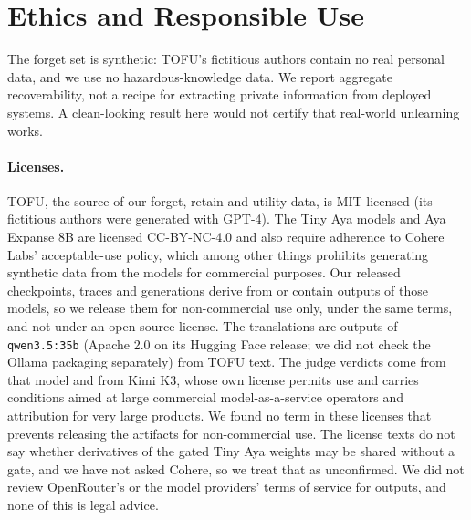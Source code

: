 \documentclass[10pt,twocolumn]{article}
\newcommand{\code}[1]{\texttt{#1}}
\begin{document}
\section{Ethics and Responsible Use}
\label{sec:ethics}
The forget set is synthetic: TOFU's fictitious authors contain no real personal data, and we use no hazardous-knowledge data. We report aggregate recoverability, not a recipe for extracting private information from deployed systems. A clean-looking result here would not certify that real-world unlearning works.

\paragraph{Licenses.} TOFU, the source of our forget, retain and utility data, is MIT-licensed (its fictitious authors were generated with GPT-4). The Tiny Aya models and Aya Expanse 8B are licensed CC-BY-NC-4.0 and also require adherence to Cohere Labs' acceptable-use policy, which among other things prohibits generating synthetic data from the models for commercial purposes. Our released checkpoints, traces and generations derive from or contain outputs of those models, so we release them for non-commercial use only, under the same terms, and not under an open-source license. The translations are outputs of \code{qwen3.5:35b} (Apache 2.0 on its Hugging Face release; we did not check the Ollama packaging separately) from TOFU text. The judge verdicts come from that model and from Kimi K3, whose own license permits use and carries conditions aimed at large commercial model-as-a-service operators and attribution for very large products. We found no term in these licenses that prevents releasing the artifacts for non-commercial use. The license texts do not say whether derivatives of the gated Tiny Aya weights may be shared without a gate, and we have not asked Cohere, so we treat that as unconfirmed. We did not review OpenRouter's or the model providers' terms of service for outputs, and none of this is legal advice.

\end{document}
